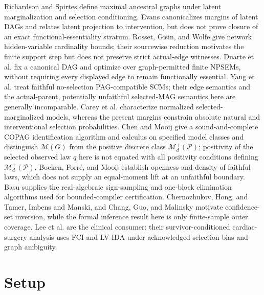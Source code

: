 \documentclass{article}
\begin{document}
Richardson and Spirtes define maximal ancestral graphs under latent marginalization and selection conditioning.  Evans canonicalizes margins of latent DAGs and relates latent projection to intervention, but does not prove closure of an exact functional-essentiality stratum.  Rosset, Gisin, and Wolfe give network hidden-variable cardinality bounds; their sourcewise reduction motivates the finite support step but does not preserve strict actual-edge witnesses.  Duarte et al. fix a canonical DAG and optimize over graph-permitted finite NPSEMs, without requiring every displayed edge to remain functionally essential.  Yang et al. treat faithful no-selection PAG-compatible SCMs; their edge semantics and the actual-parent, potentially unfaithful selected-MAG semantics here are generally incomparable.  Carey et al. characterize normalized selected-marginalized models, whereas the present margins constrain absolute natural and interventional selection probabilities.  Chen and Mooij give a sound-and-complete COPAG identification algorithm and calculus on specified model classes and distinguish \(\mathcal M(G)\) from the positive discrete class \(\mathcal M_d^+(\mathcal P)\); positivity of the selected observed law \(q\) here is not equated with all positivity conditions defining \(\mathcal M_d^+(\mathcal P)\).  Boeken, Forr\'e, and Mooij establish openness and density of faithful laws, which does not supply an equal-moment lift at an unfaithful boundary.  Basu supplies the real-algebraic sign-sampling and one-block elimination algorithms used for bounded-compiler certification.  Chernozhukov, Hong, and Tamer, Imbens and Manski, and Chang, Guo, and Malinsky motivate confidence-set inversion, while the formal inference result here is only finite-sample outer coverage.  Lee et al. are the clinical consumer: their survivor-conditioned cardiac-surgery analysis uses FCI and LV-IDA under acknowledged selection bias and graph ambiguity.

\section{Setup}
\end{document}
